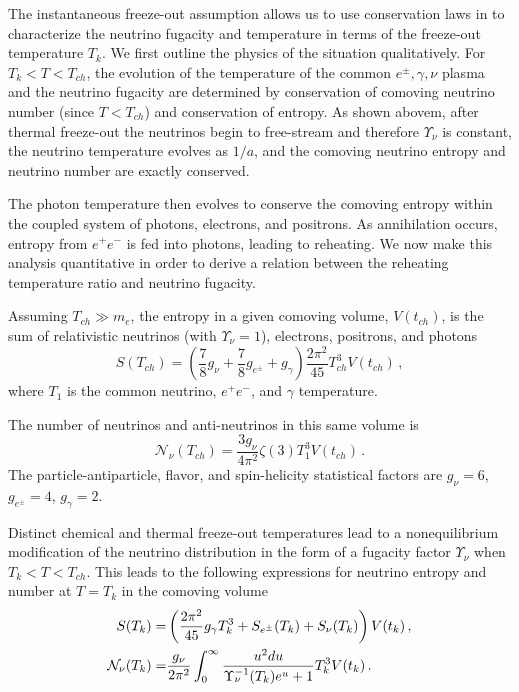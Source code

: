 The instantaneous freeze-out assumption allows us to use conservation laws in  to characterize the neutrino fugacity and temperature in terms of the freeze-out temperature $T_k$. We first outline the physics of the situation qualitatively. For $T_k<T<T_{ch}$, the evolution of the temperature of the common $e^\pm,\gamma,\nu$ plasma and the neutrino fugacity are determined by conservation of comoving neutrino number (since $T<T_{ch}$) and conservation of entropy. As shown abovem, after thermal freeze-out the neutrinos begin to free-stream and therefore $\Upsilon_\nu$ is constant, the neutrino temperature evolves as $1/a$, and the comoving neutrino entropy and neutrino number are exactly conserved. 

The photon temperature then evolves to conserve the comoving entropy within the coupled system of photons, electrons, and positrons. As annihilation occurs, entropy from $e^+e^-$ is fed into photons, leading to reheating. We now make this analysis quantitative in order to derive a relation between the reheating temperature ratio and neutrino fugacity.

Assuming $T_{ch}\gg m_e$, the entropy in a given comoving volume, $V(t_{ch})$, is the sum of relativistic neutrinos (with $\Upsilon_\nu=1$), electrons, positrons, and photons
\begin{equation}
S(T_{ch})=\left(\frac{7}{8}g_\nu+\frac{7}{8}g_{e^\pm} +g_\gamma \right)\frac{2\pi^2}{45} T_{ch}^3V(t_{ch})\,,
\end{equation}
where $T_1$ is the common neutrino, $e^+e^-$, and $\gamma$ temperature. 

The number of neutrinos and anti-neutrinos in this same volume is
\begin{equation}
\mathcal{N}_\nu(T_{ch})=\frac{3g_\nu}{4\pi^2}\zeta(3)T_1^3V(t_{ch})\,.
\end{equation}
The particle-antiparticle, flavor, and spin-helicity statistical factors are $g_\nu=6$, $g_{e^\pm}=4$, $g_\gamma=2$.

Distinct chemical and thermal freeze-out temperatures lead to a nonequilibrium modification of the neutrino distribution in the form of a fugacity factor $\Upsilon_\nu$ when $T_k<T<T_{ch}$. This leads to the following expressions for neutrino entropy and number at $T=T_k$ in the comoving volume
\begin{align}
S(T_k)=&\left(\frac{2\pi^2}{45}g_\gamma T_k^3+S_{e^\pm}(T_k)+S_{\nu}(T_k)\right)V(t_k)\,,\\
\mathcal{N}_{\nu}(T_k)=&\frac{g_\nu}{2\pi^2}\int_0^\infty \frac{u^2 du}{\Upsilon_\nu^{-1}(T_k)e^u+1}T_k^3V(t_k)\,.\notag
\end{align}

